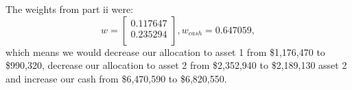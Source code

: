 \documentclass{article}
\begin{document}
The weights from part ii were:
\begin{equation*}
w = %
\begin{bmatrix}{}
 0.117647 \\ 
  0.235294 \\ 
  \end{bmatrix},
w_{cash} = 0.647059,
\end{equation*}
which means we would decrease our allocation to asset 1 from \$1,176,470 to \$990,320, decrease our allocation to asset 2 from \$2,352,940 to \$2,189,130 asset 2 and increase our cash from \$6,470,590 to \$6,820,550.
\end{document}
